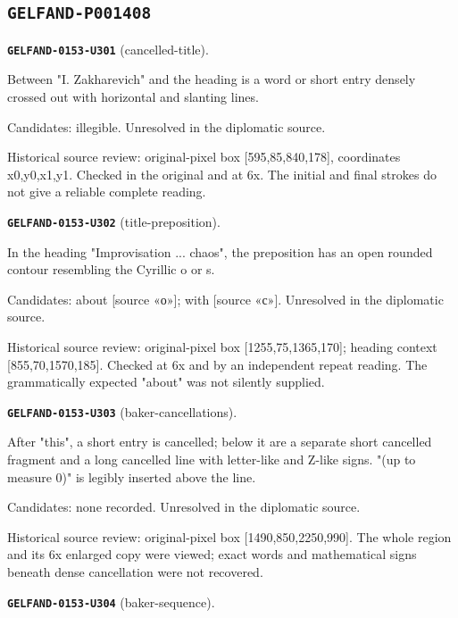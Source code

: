 \subsection*{\texttt{GELFAND-P001408}}
\par\noindent\leavevmode{}\label{GELFAND-0153-U301}\textbf{\texttt{GELFAND-0153-U301}} (cancelled-title).\nopagebreak[4]\par
Between "I. Zakharevich" and the heading is a word or short entry densely crossed out with horizontal and slanting lines.\par
Candidates: illegible. Unresolved in the diplomatic source.\par
Historical source review: original-pixel box [595,85,840,178], coordinates x0,y0,x1,y1. Checked in the original and at 6x. The initial and final strokes do not give a reliable complete reading.\par\medskip
\par\noindent\leavevmode{}\label{GELFAND-0153-U302}\textbf{\texttt{GELFAND-0153-U302}} (title-preposition).\nopagebreak[4]\par
In the heading "Improvisation ... chaos", the preposition has an open rounded contour resembling the Cyrillic o or s.\par
Candidates: about [source «о»]; with [source «с»]. Unresolved in the diplomatic source.\par
Historical source review: original-pixel box [1255,75,1365,170]; heading context [855,70,1570,185]. Checked at 6x and by an independent repeat reading. The grammatically expected "about" was not silently supplied.\par\medskip
\par\noindent\leavevmode{}\label{GELFAND-0153-U303}\textbf{\texttt{GELFAND-0153-U303}} (baker-cancellations).\nopagebreak[4]\par
After "this", a short entry is cancelled; below it are a separate short cancelled fragment and a long cancelled line with letter-like and Z-like signs. "(up to measure 0)" is legibly inserted above the line.\par
Candidates: none recorded. Unresolved in the diplomatic source.\par
Historical source review: original-pixel box [1490,850,2250,990]. The whole region and its 6x enlarged copy were viewed; exact words and mathematical signs beneath dense cancellation were not recovered.\par\medskip
\par\noindent\leavevmode{}\label{GELFAND-0153-U304}\textbf{\texttt{GELFAND-0153-U304}} (baker-sequence).\nopagebreak[4]\par

